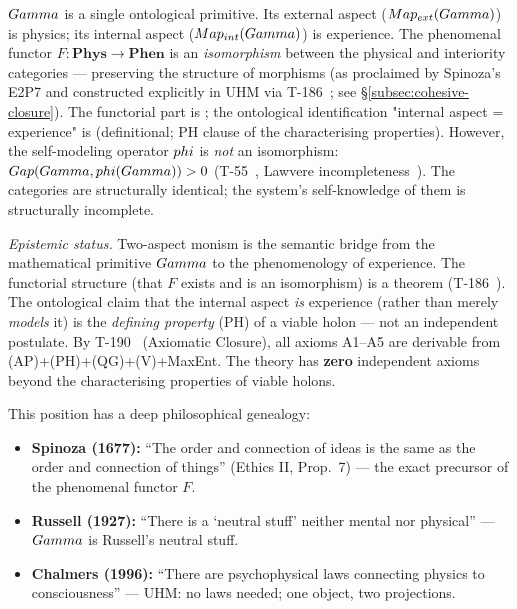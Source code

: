 \begin{definition}
\label{def:two-aspect}
$Gamma$ is a single ontological primitive. Its external aspect
($Map_{ext}(Gamma)$) is physics; its internal aspect
($Map_{int}(Gamma)$) is experience. The phenomenal functor
$F: \mathbf{Phys} \to \mathbf{Phen}$ is an \emph{isomorphism} between the physical
and interiority categories --- preserving the structure of morphisms (as proclaimed by
Spinoza's E2P7 and constructed explicitly in UHM via T-186~; see
\S\ref{subsec:cohesive-closure}). The functorial part is ; the
ontological identification "internal aspect = experience" is 
(definitional; PH clause of the characterising properties). However, the self-modeling operator $phi$ is
\emph{not} an isomorphism: $Gap(Gamma, phi(Gamma)) > 0$ (T-55~, Lawvere
incompleteness~\cite{lawvere1969}). The categories are structurally identical; the
system's self-knowledge of them is structurally incomplete.

\medskip\noindent\textit{Epistemic status.} Two-aspect monism is the semantic bridge
from the mathematical primitive $Gamma$ to the phenomenology of experience. The functorial
structure (that $F$ exists and is an isomorphism) is a theorem (T-186~). The
ontological claim that the internal aspect \emph{is} experience (rather than merely
\emph{models} it) is the \emph{defining property} (PH) of a viable holon --- not an
independent postulate. By T-190~ (Axiomatic Closure), all axioms A1--A5 are
derivable from (AP)+(PH)+(QG)+(V)+MaxEnt. The theory has \textbf{zero} independent axioms
beyond the characterising properties of viable holons.
\end{definition}

This position has a deep philosophical genealogy:
\begin{itemize}[leftmargin=2em]
  \item \textbf{Spinoza (1677):} ``The order and connection of ideas is the same as the
        order and connection of things'' (Ethics II, Prop.~7) --- the exact precursor of
        the phenomenal functor $F$.
  \item \textbf{Russell (1927):} ``There is a `neutral stuff' neither mental nor physical''
        --- $Gamma$ is Russell's neutral stuff.
  \item \textbf{Chalmers (1996):} ``There are psychophysical laws connecting physics to
        consciousness'' --- UHM: no laws needed; one object, two projections.
\end{itemize}


